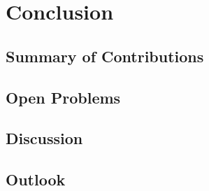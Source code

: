 \chapter{Conclusion}
\label{chap:extro}


\section{Summary of Contributions}

\section{Open Problems}

\section{Discussion}

\section{Outlook}
